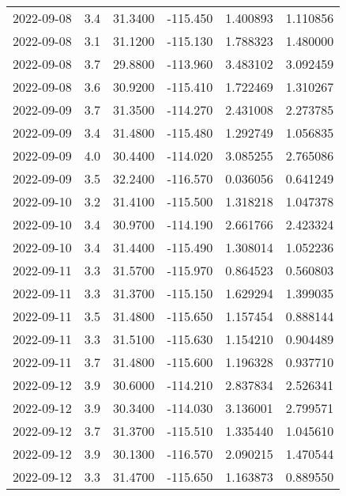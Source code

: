 \begin{tabular}{lrrrrr}
2022-09-08 &       3.4 &  31.3400 &  -115.450 &         1.400893 &         1.110856 \\
2022-09-08 &       3.1 &  31.1200 &  -115.130 &         1.788323 &         1.480000 \\
2022-09-08 &       3.7 &  29.8800 &  -113.960 &         3.483102 &         3.092459 \\
2022-09-08 &       3.6 &  30.9200 &  -115.410 &         1.722469 &         1.310267 \\
2022-09-09 &       3.7 &  31.3500 &  -114.270 &         2.431008 &         2.273785 \\
2022-09-09 &       3.4 &  31.4800 &  -115.480 &         1.292749 &         1.056835 \\
2022-09-09 &       4.0 &  30.4400 &  -114.020 &         3.085255 &         2.765086 \\
2022-09-09 &       3.5 &  32.2400 &  -116.570 &         0.036056 &         0.641249 \\
2022-09-10 &       3.2 &  31.4100 &  -115.500 &         1.318218 &         1.047378 \\
2022-09-10 &       3.4 &  30.9700 &  -114.190 &         2.661766 &         2.423324 \\
2022-09-10 &       3.4 &  31.4400 &  -115.490 &         1.308014 &         1.052236 \\
2022-09-11 &       3.3 &  31.5700 &  -115.970 &         0.864523 &         0.560803 \\
2022-09-11 &       3.3 &  31.3700 &  -115.150 &         1.629294 &         1.399035 \\
2022-09-11 &       3.5 &  31.4800 &  -115.650 &         1.157454 &         0.888144 \\
2022-09-11 &       3.3 &  31.5100 &  -115.630 &         1.154210 &         0.904489 \\
2022-09-11 &       3.7 &  31.4800 &  -115.600 &         1.196328 &         0.937710 \\
2022-09-12 &       3.9 &  30.6000 &  -114.210 &         2.837834 &         2.526341 \\
2022-09-12 &       3.9 &  30.3400 &  -114.030 &         3.136001 &         2.799571 \\
2022-09-12 &       3.7 &  31.3700 &  -115.510 &         1.335440 &         1.045610 \\
2022-09-12 &       3.9 &  30.1300 &  -116.570 &         2.090215 &         1.470544 \\
2022-09-12 &       3.3 &  31.4700 &  -115.650 &         1.163873 &         0.889550 \\

\end{tabular}
